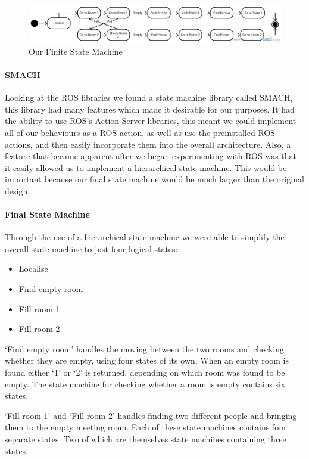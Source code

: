 \begin{figure}
\includegraphics[width=\textwidth]{ca}
\caption{Our Finite State Machine}
\end{figure}

\paragraph{SMACH}

Looking at the ROS libraries we found a state machine library called SMACH, this library had many features which made it desirable for our purposes.  It had the ability to use ROS’s Action Server libraries, this meant we could implement all of our behaviours as a ROS action, as well as use the preinstalled ROS actions, and then easily incorporate them into the overall architecture. Also, a feature that became apparent after we began experimenting with ROS was that it easily allowed us to implement a hierarchical state machine. This would be important because our final state machine would be much larger than the original design.

\paragraph{Final State Machine}

Through the use of a hierarchical state machine we were able to simplify the overall state machine to just four logical states:

\begin{itemize}
\item Localise
\item Find empty room
\item Fill room 1
\item Fill room 2
\end{itemize}

‘Find empty room’ handles the moving between the two rooms and checking whether they are empty, using four states of its own. When an empty room is found either ‘1’ or ‘2’ is returned, depending on which room was found to be empty. The state machine for checking whether a room is empty contains six states. 

‘Fill room 1’ and ‘Fill room 2’ handles finding two different people and bringing them to the empty meeting room. Each of these state machines contains four separate states. Two of which are themselves state machines containing three states.

